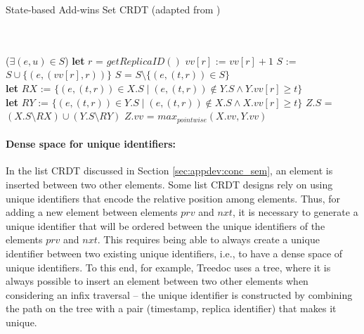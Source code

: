 \documentclass[11pt,a4paper]{article}
\newcommand{\Let}{\textbf{let} }
\begin{document}
\begin{algorithm}
\caption{State-based Add-wins Set CRDT (adapted from \cite{Bieniusa12Optimized})}
\label{alg:st:addwins}
\begin{algorithmic}[1]
 \\
\\
\EndPayload
{}
\State \Return ($\exists (e,u) \in S$)
\EndQuery
{}
\State \Let $r$ = $\mathit{getReplicaID}()$
\State $\mathit{vv}[r]$ := $\mathit{vv}[r] + 1$ 
\State $S$ := $S \cup \{(e,(\mathit{vv}[r],r))\}$ 
\EndUpdate
{}
\State $S$ = $S \setminus \{(e,(t,r)) \in S\}$
\EndUpdate
{}\\
\State \Let $\mathit{RX}$ := $\{(e,(t,r)) \in X.S \mid (e,(t,r)) \not \in Y.S \wedge Y.\mathit{vv}[r] \geq t\}$\\
\State \Let $\mathit{RY}$ := $\{(e,(t,r)) \in Y.S \mid (e,(t,r)) \not \in X.S \wedge X.\mathit{vv}[r] \geq t\}$
\State $Z.S$ = $(X.S \setminus \mathit{RX}) \cup (Y.S \setminus \mathit{RY})$ 
\State $Z.\mathit{vv}$ = $\mathit{max}_{\mathit{pointwise}}(X.\mathit{vv},Y.\mathit{vv})$ 
\EndMerge
\end{algorithmic}
\end{algorithm}

\paragraph{Dense space for unique identifiers:}
In the list CRDT discussed in Section \ref{sec:appdev:conc_sem}, an element is inserted
between two other elements. 
Some list CRDT designs \cite{Preguica09Commutative,Weiss09Logoot} rely on using 
unique identifiers that encode the relative position among elements. Thus, for 
adding a new element between elements $prv$ and $nxt$, it is necessary to generate 
a unique identifier that will be ordered between the unique identifiers of the 
elements $prv$ and $nxt$. 
This requires being able to always create a unique identifier between two existing 
unique identifiers, i.e., to have a dense space of unique identifiers.
To this end, for example, Treedoc \cite{Preguica09Commutative} uses a tree, where it is always 
possible to insert an element between two other elements when considering an infix 
traversal -- the unique identifier is constructed by combining the path on the tree 
with a pair (timestamp, replica identifier) that makes it unique.
\end{document}

